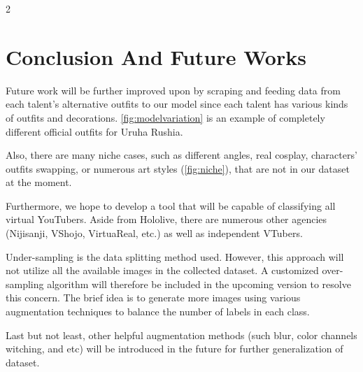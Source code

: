 \label{Chapter Conclusion And Future Works}
    \begin{multicols}{2}
        \section{Conclusion And Future Works}
            Future work will be further improved upon by scraping and feeding data from each talent's alternative outfits to our model since each talent has various kinds of outfits and decorations. 
            \autoref{fig:modelvariation} is an example of completely different official outfits for Uruha Rushia.
            
            Also, there are many niche cases, such as different angles, real cosplay, characters' outfits swapping, or numerous art styles (\autoref{fig:niche}), that are not in our dataset at the moment.
            
            Furthermore, we hope to develop a tool that will be capable of classifying all virtual YouTubers. Aside from Hololive, there are numerous other agencies (Nijisanji, VShojo, VirtuaReal, etc.) as well as independent VTubers.
        
            Under-sampling is the data splitting method used. However, this approach will not utilize all the available images in the collected dataset. 
            A customized over-sampling algorithm will therefore be included in the upcoming version to resolve this concern. 
            The brief idea is to generate more images using various augmentation techniques to balance the number of labels in each class.

            Last but not least, other helpful augmentation methods (such blur, color channels witching, and etc) will be introduced in the future for further generalization of dataset.
            
    \end{multicols}
